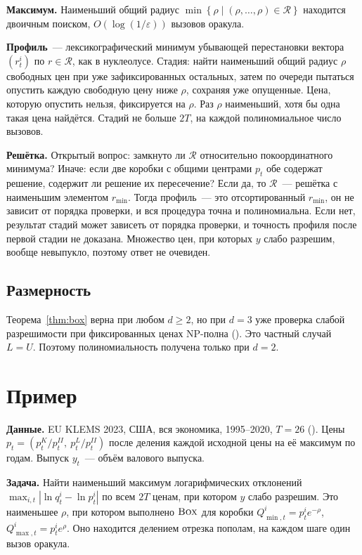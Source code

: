 \documentclass[a4paper,11pt]{article}
\theoremstyle{plain}
\theoremstyle{definition}
\theoremstyle{remark}
\newcommand{\abs}[1]{\left\lvert #1 \right\rvert}
\newcommand{\set}[1]{\left\{ #1 \right\}}
\newcommand{\BOX}{\textup{\textsc{Box}}}
\begin{document}
\textbf{Максимум.} Наименьший общий радиус $\min\set{\rho\mid(\rho,\dots,\rho)\in\mathcal R}$ находится двоичным поиском, $O(\log(1/\varepsilon))$ вызовов оракула.

\textbf{Профиль}~--- лексикографический минимум убывающей перестановки вектора $(r^i_t)$ по $r\in\mathcal R$, как в нуклеолусе. Стадия: найти наименьший общий радиус $\rho$ свободных цен при уже зафиксированных остальных, затем по очереди пытаться опустить каждую свободную цену ниже $\rho$, сохраняя уже опущенные. Цена, которую опустить нельзя, фиксируется на $\rho$. Раз $\rho$ наименьший, хотя бы одна такая цена найдётся. Стадий не больше $2T$, на каждой полиномиальное число вызовов.

\textbf{Решётка.} Открытый вопрос: замкнуто ли $\mathcal R$ относительно покоординатного минимума? Иначе: если две коробки с общими центрами $p_t$ обе содержат решение, содержит ли решение их пересечение? Если да, то $\mathcal R$~--- решётка с наименьшим элементом $r_{\min}$. Тогда профиль~--- это отсортированный $r_{\min}$, он не зависит от порядка проверки, и вся процедура точна и полиномиальна. Если нет, результат стадий может зависеть от порядка проверки, и точность профиля после первой стадии не доказана. Множество цен, при которых $y$ слабо разрешим, вообще невыпукло, поэтому ответ не очевиден.

\subsection{Размерность}

Теорема~\ref{thm:box} верна при любом $d\ge2$, но при $d=3$ уже проверка слабой разрешимости при фиксированных ценах NP-полна (). Это частный случай $L=U$. Поэтому полиномиальность получена только при $d=2$.

\section{Пример}\label{sec:example}

\textbf{Данные.} EU KLEMS 2023, США, вся экономика, 1995--2020, $T=26$ (). Цены $p_t=(p^K_t/p^{II}_t,\ p^L_t/p^{II}_t)$ после деления каждой исходной цены на её максимум по годам. Выпуск $y_t$~--- объём валового выпуска.

\textbf{Задача.} Найти наименьший максимум логарифмических отклонений $\max_{i,t}\abs{\ln q^i_t-\ln p^i_t}$ по всем $2T$ ценам, при котором $y$ слабо разрешим. Это наименьшее $\rho$, при котором выполнено $\BOX$ для коробки $Q^i_{\min,t}=p^i_te^{-\rho}$, $Q^i_{\max,t}=p^i_te^{\rho}$. Оно находится делением отрезка пополам, на каждом шаге один вызов оракула.
\end{document}
